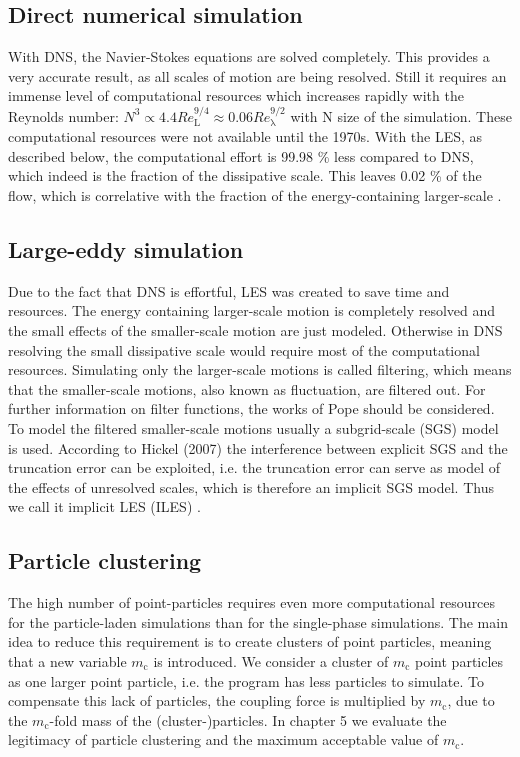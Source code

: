 \documentclass[11pt,a4paper,openany,oneside,parskip=half*]{article}
\begin{document}
\subsection{Direct numerical simulation}
With DNS, the Navier-Stokes equations are solved completely. This provides a very accurate result, as all scales of motion are being resolved. Still it requires an immense level of computational resources which increases rapidly with the Reynolds number: $N^3 \propto 4.4 Re_{\mathrm{L}}^{9/4} \approx 0.06 Re_{\mathrm{\lambda}}^{9/2}$ with N size of the simulation. These computational resources were not available until the 1970s. With the LES, as described below, the computational effort is 99.98 \% less compared to DNS, which indeed is the fraction of the dissipative scale. This leaves 0.02 \% of the flow, which is correlative with the fraction of the energy-containing larger-scale \cite{turbulentFlows}.%
\subsection{Large-eddy simulation}
Due to the fact that DNS is effortful, LES was created to save time and resources. The energy containing larger-scale motion is completely resolved and the small effects of the smaller-scale motion are just modeled. Otherwise in DNS resolving the small dissipative scale would require most of the computational resources.
\newline
Simulating only the larger-scale motions is called filtering, which means that the smaller-scale motions, also known as fluctuation, are filtered out. For further information on filter functions, the works of Pope \cite{turbulentFlows} should be considered. To model the filtered smaller-scale motions usually a subgrid-scale (SGS) model is used. According to Hickel (2007) the interference between explicit SGS and the truncation error can be exploited, i.e. the truncation error can serve as model of the effects of unresolved scales, which is therefore an implicit SGS model. Thus we call it implicit LES (ILES) \cite{implicitLES}. %
\subsection{Particle clustering}
The high number of point-particles requires even more computational resources for the particle-laden simulations than for the single-phase simulations. The main idea to reduce this requirement is to create clusters of point particles, meaning that a new variable $m_\mathrm{c}$ is introduced. We consider a cluster of $m_\mathrm{c}$ point particles as one larger point particle, i.e. the program has less particles to simulate. To compensate this lack of particles, the coupling force is multiplied by $m_\mathrm{c}$, due to the $m_\mathrm{c}$-fold mass of the (cluster-)particles. In chapter 5 we evaluate the legitimacy of particle clustering and the maximum acceptable value of $m_\mathrm{c}$.
\pagebreak
\end{document}
